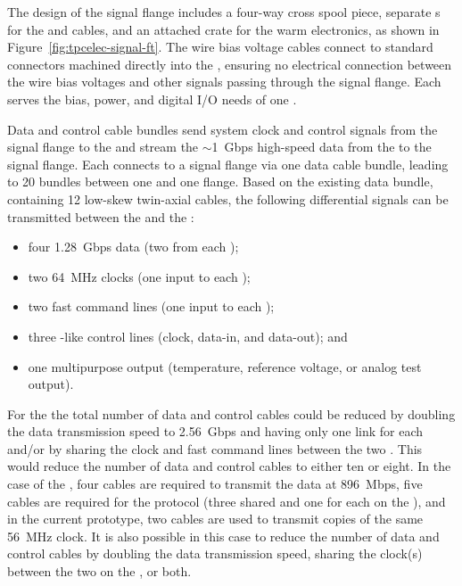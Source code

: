 The design of the signal flange includes a four-way cross spool 
piece, separate  \fdth{}s for the  and 
 cables, and an attached crate for the  
warm electronics, as shown in Figure~\ref{fig:tpcelec-signal-ft}.
The wire bias voltage cables connect to standard  
connectors machined directly into the  \fdth{}, ensuring 
no electrical connection between the wire bias voltages and other 
signals passing through the signal flange. Each  \fdth 
serves the bias, power, and digital I/O needs of one .  

Data and control cable bundles send system clock and control signals 
from the signal flange to the  and stream the $\sim$\SI{1}{Gbps} 
high-speed data from the  to the signal flange. Each 
 connects to a signal flange via one data cable bundle, 
leading to \num{20} bundles between one  and one flange. 
Based on the existing  data bundle, containing \num{12} 
low-skew twin-axial cables, the following differential signals
can be transmitted between the  and the :
\begin{itemize}
\item four \SI{1.28}{Gbps} data (two from each );
\item two \SI{64}{MHz} clocks (one input to each );
\item two fast command lines (one input to each );
\item three -like control lines (clock, data-in, and data-out); and
\item one multipurpose  output (temperature, 
reference voltage, or analog test output).
\end{itemize}
For the   the total number of data and control cables could be 
reduced by doubling the data transmission speed to \SI{2.56}{Gbps}
and having only one link for each  and/or by
sharing the clock and fast command lines between the two 
 . This would reduce the number
of data and control cables to either ten or eight. In the
case of the , four cables are required to transmit
the data at \SI{896}{Mbps}, five cables are required for the
 protocol (three shared and one for each 
on the ), and in the current  prototype, 
two cables are used to transmit copies of the same \SI{56}{MHz}
clock. It is also possible in this case to reduce the 
number of data and control cables by %
doubling the data transmission 
speed, %
sharing the clock(s) between the two  
on the , or %
both.

